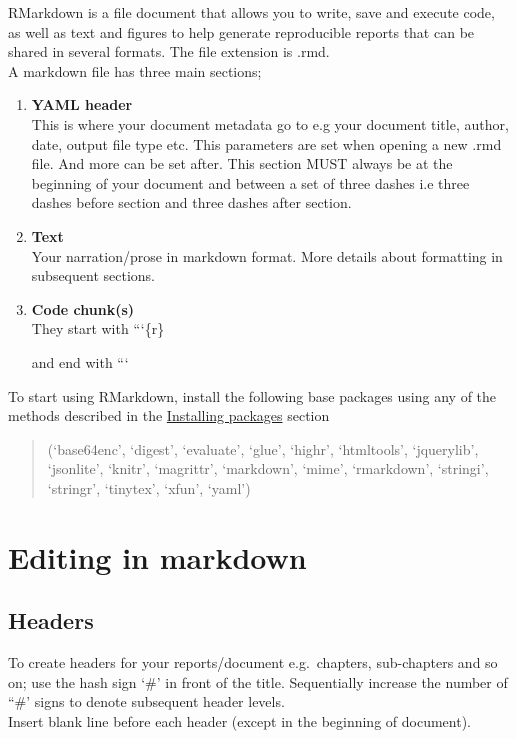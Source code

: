 \documentclass[
]{book}
\begin{document}
RMarkdown is a file document that allows you to write, save and execute code, as well as text and figures to help generate reproducible reports that can be shared in several formats.
The file extension is .rmd.\\
A markdown file has three main sections;

\begin{enumerate}
\def\labelenumi{\arabic{enumi}.}
\item
  \textbf{YAML header}\\
  This is where your document metadata go to e.g your document title, author, date, output file type etc.
  This parameters are set when opening a new .rmd file. And more can be set after.
  This section MUST always be at the beginning of your document and between a set of three dashes i.e three dashes before section and three dashes after section.
\item
  \textbf{Text}\\
  Your narration/prose in markdown format. More details about formatting in subsequent sections.
\item
  \textbf{Code chunk(s)}\\
  They start with ```\{r\}

  and end with ```
\end{enumerate}

To start using RMarkdown, install the following base packages using any of the methods described in the \protect\hyperlink{installing-packages}{Installing packages} section

\begin{quote}
(`base64enc', `digest', `evaluate', `glue', `highr', `htmltools', `jquerylib', `jsonlite', `knitr', `magrittr', `markdown', `mime',
`rmarkdown', `stringi', `stringr', `tinytex', `xfun', `yaml')
\end{quote}

\hypertarget{editing-in-markdown}{%
\section{Editing in markdown}\label{editing-in-markdown}}

\hypertarget{headers}{%
\subsection{Headers}\label{headers}}

To create headers for your reports/document e.g.~chapters, sub-chapters and so on; use the hash sign `\#' in front of the title. Sequentially increase the number of ``\#' signs to denote subsequent header levels.\\
Insert blank line before each header (except in the beginning of document).
\end{document}
